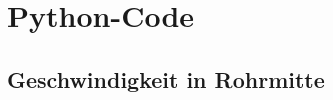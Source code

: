 %
\section{Python-Code}
\label{app:python}

\subsection{Geschwindigkeit in Rohrmitte}
\label{app:python:rohrmitte}


